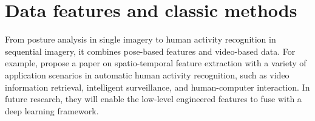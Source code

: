 \section{Data features and classic methods}
\label{sec:Data features and classic methods}
\citet{thrasher2011mood}

From posture analysis in single imagery to human activity recognition in sequential imagery, it combines pose-based features and video-based data.
For example, \citet{yao2016spatio} propose a paper on spatio-temporal feature extraction with a variety of application scenarios in automatic human activity recognition, such as video information retrieval, intelligent surveillance, and human-computer interaction.
In future research, they will enable the low-level engineered features to fuse with a deep learning framework.

\citet{schuldt2004recognizing}

\citet{gorelick2007actions}

\citet{marszalek2009actions}

\citet{Soomro2014}